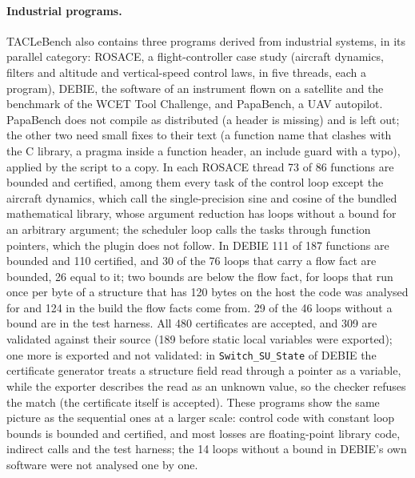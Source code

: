 \documentclass[oneside,english]{amsart}
\numberwithin{equation}{section}
\numberwithin{figure}{section}
\theoremstyle{plain}
\theoremstyle{definition}
\theoremstyle{plain}
\theoremstyle{remark}
\theoremstyle{plain}
\theoremstyle{definition}
\theoremstyle{plain}
\theoremstyle{remark}
\begin{document}
\paragraph{Industrial programs.}
TACLeBench also contains three programs derived from industrial systems, in its parallel category: ROSACE, a flight-controller case study (aircraft dynamics, filters and altitude and vertical-speed control laws, in five threads, each a program), DEBIE, the software of an instrument flown on a satellite and the benchmark of the WCET Tool Challenge, and PapaBench, a UAV autopilot. PapaBench does not compile as distributed (a header is missing) and is left out; the other two need small fixes to their text (a function name that clashes with the C library, a pragma inside a function header, an include guard with a typo), applied by the script to a copy. In each ROSACE thread 73 of 86 functions are bounded and certified, among them every task of the control loop except the aircraft dynamics, which call the single-precision sine and cosine of the bundled mathematical library, whose argument reduction has loops without a bound for an arbitrary argument; the scheduler loop calls the tasks through function pointers, which the plugin does not follow. In DEBIE 111 of 187 functions are bounded and 110 certified, and 30 of the 76 loops that carry a flow fact are bounded, 26 equal to it; two bounds are below the flow fact, for loops that run once per byte of a structure that has 120 bytes on the host the code was analysed for and 124 in the build the flow facts come from. 29 of the 46 loops without a bound are in the test harness. All 480 certificates are accepted, and 309 are validated against their source (189 before static local variables were exported); one more is exported and not validated: in \texttt{Switch\_SU\_State} of DEBIE the certificate generator treats a structure field read through a pointer as a variable, while the exporter describes the read as an unknown value, so the checker refuses the match (the certificate itself is accepted). These programs show the same picture as the sequential ones at a larger scale: control code with constant loop bounds is bounded and certified, and most losses are floating-point library code, indirect calls and the test harness; the 14 loops without a bound in DEBIE's own software were not analysed one by one.
\end{document}
